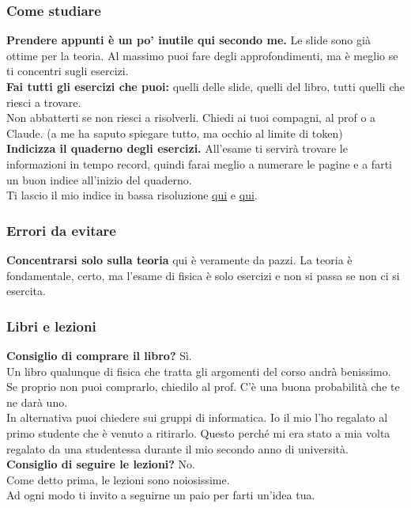 \documentclass[18pt]{extarticle}
\begin{document}
\subsubsection{Come studiare}
\textbf{Prendere appunti è un po' inutile qui secondo me.} Le slide sono già ottime per la teoria. Al massimo puoi fare degli approfondimenti, ma è meglio se ti concentri sugli esercizi.\\
\textbf{Fai tutti gli esercizi che puoi:} quelli delle slide, quelli del libro, tutti quelli che riesci a trovare.\\
Non abbatterti se non riesci a risolverli. Chiedi ai tuoi compagni, al prof o a Claude. (a me ha saputo spiegare tutto, ma occhio al limite di token)\\
\textbf{Indicizza il quaderno degli esercizi.} All'esame ti servirà trovare le informazioni in tempo record, quindi farai meglio a numerare le pagine e a farti un buon indice all'inizio del quaderno.\\
Ti lascio il mio indice in bassa risoluzione \href{https://github.com/Verryx-02/Scuola-di-sopravvivenza-per-studenti-di-Informatica/blob/main/assets/Esempio-indice-fisica/Indice1Fisica.jpeg}{qui} e \href{https://github.com/Verryx-02/Scuola-di-sopravvivenza-per-studenti-di-Informatica/blob/main/assets/Esempio-indice-fisica/Indice2Fisica.jpeg}{qui}.


\subsubsection{Errori da evitare}
\textbf{Concentrarsi solo sulla teoria} qui è veramente da pazzi. La teoria è fondamentale, certo, ma l'esame di fisica è solo esercizi e non si passa se non ci si esercita.

\subsubsection{Libri e lezioni}
\textbf{Consiglio di comprare il libro?} Sì.\\
Un libro qualunque di fisica che tratta gli argomenti del corso andrà benissimo. Se proprio non puoi comprarlo, chiedilo al prof. C'è una buona probabilità che te ne darà uno.\\
In alternativa puoi chiedere sui gruppi di informatica. Io il mio l'ho regalato al primo studente che è venuto a ritirarlo. Questo perché mi era stato a mia volta regalato da una studentessa durante il mio secondo anno di università.\\
\textbf{Consiglio di seguire le lezioni?} No.\\
Come detto prima, le lezioni sono noiosissime.\\
Ad ogni modo ti invito a seguirne un paio per farti un'idea tua.\\
\end{document}

